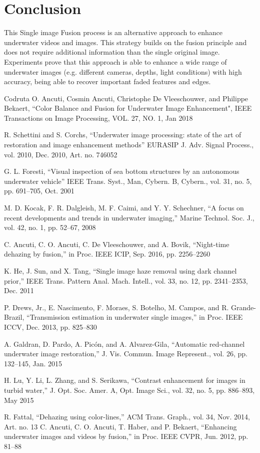 \documentclass[hidelinks, 12pt]{report}
\begin{document}
\chapter{Conclusion}
This Single image Fusion process is an alternative approach to enhance underwater videos and images. This strategy builds on the fusion principle and does not require additional information than the single original image. Experiments prove that this approach is able to enhance a wide range
of underwater images (e.g. different cameras, depths, light conditions) with high accuracy, being able to recover important faded features and edges.
\pagebreak
\begin{thebibliography}{11}
\bibitem{}Codruta O. Ancuti, Cosmin Ancuti, Christophe De Vleeschouwer, and Philippe Bekaert, ``Color Balance and Fusion for Underwater Image Enhancement", IEEE Transactions on Image Processing, VOL. 27, NO. 1, Jan 2018

 R. Schettini and S. Corchs, ``Underwater image processing: state of the art of restoration and image enhancement methods” EURASIP J. Adv. Signal Process., vol. 2010, Dec. 2010, Art. no. 746052 

 G. L. Foresti, ``Visual inspection of sea bottom structures by an autonomous underwater vehicle” IEEE Trans. Syst., Man, Cybern. B, Cybern., vol. 31, no. 5, pp. 691–705, Oct. 2001

 M. D. Kocak, F. R. Dalgleish, M. F. Caimi, and Y. Y. Schechner, ``A focus on recent developments and trends in underwater imaging,” Marine Technol. Soc. J., vol. 42, no. 1, pp. 52–67, 2008

 C. Ancuti, C. O. Ancuti, C. De Vleeschouwer, and A. Bovik, ``Night-time dehazing by fusion,” in Proc. IEEE ICIP, Sep. 2016, pp. 2256–2260

 K. He, J. Sun, and X. Tang, ``Single image haze removal using dark channel prior,” IEEE Trans. Pattern Anal. Mach. Intell., vol. 33, no. 12, pp. 2341–2353, Dec. 2011

 P. Drews, Jr., E. Nascimento, F. Moraes, S. Botelho, M. Campos, and R. Grande-Brazil, ``Transmission estimation in underwater single images,” in Proc. IEEE ICCV, Dec. 2013, pp. 825–830

 A. Galdran, D. Pardo, A. Picón, and A. Alvarez-Gila, ``Automatic red-channel underwater image restoration,” J. Vis. Commun. Image Represent., vol. 26, pp. 132–145, Jan. 2015

 H. Lu, Y. Li, L. Zhang, and S. Serikawa, ``Contrast enhancement for images in turbid water,” J. Opt. Soc. Amer. A, Opt. Image Sci., vol. 32, no. 5, pp. 886–893, May 2015

 R. Fattal, ``Dehazing using color-lines,” ACM Trans. Graph., vol. 34, Nov. 2014, Art. no. 13
 C. Ancuti, C. O. Ancuti, T. Haber, and P. Bekaert, ``Enhancing underwater images and videos by fusion,” in Proc. IEEE CVPR, Jun. 2012,
pp. 81–88

\end{thebibliography}
\end{document}
